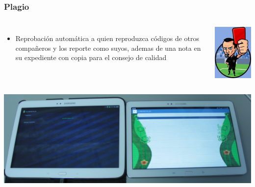 \documentclass[aspectratio=169]{beamer}
\begin{document}
\begin{frame}
\frametitle{Plagio}

\begin{columns}[c] %
\begin{itemize}
\item Reprobación automática a quien reproduzca códigos de otros compañeros y los reporte como suyos, ademas de una nota en su expediente con copia para el consejo de calidad 
\end{itemize}
\begin{center}
\includegraphics[scale=0.27]{tarjeta-roja}
\end{center}
\end{columns}
\begin{center}
\includegraphics[scale=0.23]{Pirata01}
\end{center}
\end{frame}
\end{document}
